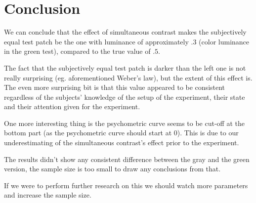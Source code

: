 \documentclass[a4paper,12pt]{article} %
\begin{document}
\pagebreak

\section{Conclusion}

We can conclude that the effect of simultaneous contrast makes the subjectively equal test patch be the one with luminance of approximately $.3$ (color luminance in the green test), compared to the true value of $.5$.

The fact that the subjectively equal test patch is darker than the left one is not really surprising (eg. aforementioned Weber's law), but the extent of this effect is. The even more surprising bit is that this value appeared to be consistent regardless of the subjects' knowledge of the setup of the experiment, their state and their attention given for the experiment.

One more interesting thing is the psychometric curve seems to be cut-off at the bottom part (as the psychometric curve should start at $0$). This is due to our underestimating of the simultaneous contrast's effect prior to the experiment.

The results didn't show any consistent difference between the gray and the green version, the sample size is too small to draw any conclusions from that.

If we were to perform further research on this we should watch more parameters and increase the sample size.
\end{document}
